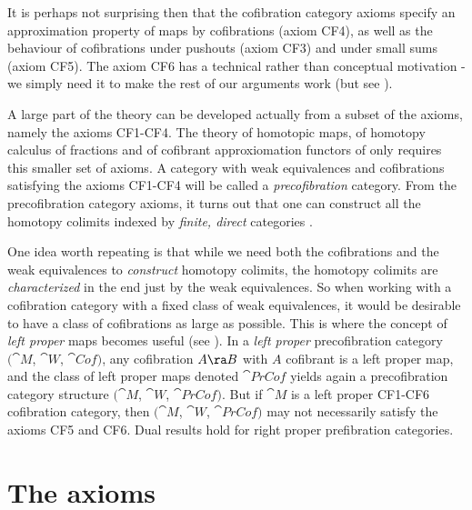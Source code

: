 It is perhaps not surprising then that the cofibration category axioms specify an approximation property of maps by cofibrations (axiom CF4), as well as the behaviour of cofibrations under pushouts (axiom CF3) and under small sums (axiom CF5). The axiom CF6 has a technical rather than conceptual motivation - we simply need it to make the rest of our arguments work (but see ).

A large part of the theory can be developed actually from a subset of the axioms, namely the axioms CF1-CF4. The theory of homotopic maps, of homotopy calculus of fractions and of cofibrant approxiomation functors of  only requires this smaller set of axioms. A category with weak equivalences and cofibrations satisfying the axioms CF1-CF4 will be called a {\it precofibration} category. From the precofibration category axioms, it turns out that one can construct all the homotopy colimits indexed by {\it finite, direct} categories \cite{Cisinski2}. 

One idea worth repeating is that while we need both the cofibrations and the weak equivalences to {\it construct} homotopy colimits, the homotopy colimits are {\it characterized} in the end just by the weak equivalences. So when working with a cofibration category with a fixed class of weak equivalences, it would be desirable to have a class of cofibrations as large as possible. This is where the concept of {\it left proper} maps becomes useful (see ). In a {\it left proper} precofibration category $({\cat M}$, ${\cat W}$, ${\cat Cof})$, any cofibration $A \ra B$ with $A$ cofibrant is a left proper map, and the class of left proper maps denoted ${\cat PrCof}$ yields again a precofibration category structure $({\cat M}$, ${\cat W}$, ${\cat PrCof})$. But if ${\cat M}$ is a left proper CF1-CF6 cofibration category, then $({\cat M}$, ${\cat W}$, ${\cat PrCof})$ may not necessarily satisfy the axioms CF5 and CF6. Dual results hold for right proper prefibration categories.

\section{The axioms}
\label{sec:CofibrationCategoriesFibrationCategoriesAxioms}

